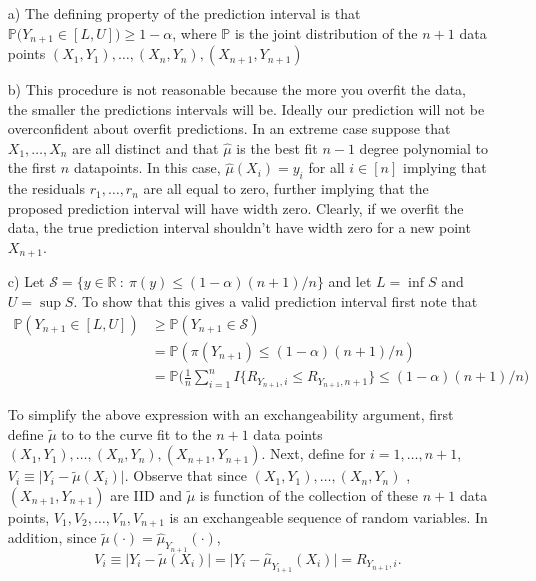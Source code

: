 \begin{enumerate}
\item[a)] The defining property of the prediction interval is that $\mathbb{P} \big(Y_{n+1} \in [L,U]  \big) \geq 1-\alpha$, where $\mathbb{P}$ is the joint distribution of the $n+1$ data points $(X_1,Y_1),\dots, (X_{n},Y_n),(X_{n+1},Y_{n+1})$

\item[b)] This procedure is not reasonable because the more you overfit the data, the smaller the predictions intervals will be. Ideally our prediction will not be overconfident about overfit predictions. In an extreme case suppose that $X_1, \dots, X_n$ are all distinct and that $\hat{\mu}$ is the best fit $n-1$ degree polynomial to the first $n$ datapoints. In this case, $\hat{\mu}(X_i)=y_i$ for all $i \in [n]$ implying that the residuals $r_1,\dots,r_n$ are all equal to zero, further implying that the proposed prediction interval will have width zero. Clearly, if we overfit the data, the true prediction interval shouldn't have width zero for a new point $X_{n+1}$.

\item[c)] Let $\mathcal{S} = \{ y \in \mathbb{R} \ : \ \pi(y) \leq (1- \alpha)(n+1)/n \}$ and let $L = \inf S$ and $U = \sup S$. To show that this gives a valid prediction interval first note that
$$\begin{aligned}
\mathbb{P} (Y_{n+1} \in [L,U] ) & \geq \mathbb{P} (Y_{n+1} \in \mathcal{S} )
\\ & =  \mathbb{P} ( \pi(Y_{n+1}) \leq (1- \alpha)(n+1)/n )
\\ & = \mathbb{P} \Big( \frac{1}{n} \sum_{i=1}^n I \{ R_{Y_{n+1}, i} \leq R_{Y_{n+1}, n+1} \} \leq (1- \alpha)(n+1)/n   \Big)
\end{aligned}$$


To simplify the above expression with an exchangeability argument, first define $\tilde{\mu}$ to to the curve fit to the $n+1$ data points $(X_1,Y_1), \dots,(X_n,Y_n), (X_{n+1},Y_{n+1})$.  Next, define for $i=1,\dots,n+1$,  $V_i \equiv  \vert Y_i - \tilde{\mu}(X_i) \vert$. Observe that since $(X_1,Y_1), \dots, (X_n,Y_n)$ , $(X_{n+1},Y_{n+1})$ are IID and  $\tilde{\mu}$ is function of the collection of these $n+1$ data points, $V_1,V_2,\dots,V_n,V_{n+1}$ is an exchangeable sequence of random variables. In addition, since $\tilde{\mu}(\cdot)=\hat{\mu}_{Y_{n+1}}(\cdot)$, $$ V_i \equiv  \vert Y_i - \tilde{\mu}(X_i) \vert = \vert Y_i -\hat{\mu}_{Y_{i+1}}(X_i) \vert =R_{Y_{n+1},i}.$$


\end{enumerate}
